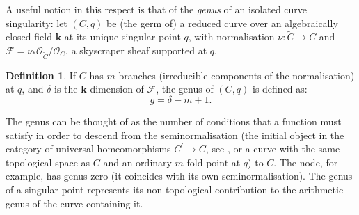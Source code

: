 \documentclass{compositio}
\renewcommand{\k}{\mathbf k}
\newcommand{\OO}{\mathcal O}
\renewcommand{\to}{\rightarrow}
\theoremstyle{plain}
\theoremstyle{definition}
\newtheorem{definition}[thm]{Definition}
\theoremstyle{remark}
\begin{document}
A useful notion in this respect is that of the \emph{genus} of an isolated curve singularity: let $(C,q)$ be (the germ of) a reduced curve over an algebraically closed field $\k$ at its unique singular point $q$, with normalisation $\nu\colon\widetilde{C}\to C$ and $\mathcal F=\nu_*\OO_{\widetilde C}/\OO_C$, a skyscraper sheaf supported at $q$.
\begin{definition}\label{def:genus}\cite{SMY1}
If $C$ has $m$ branches (irreducible components of the normalisation) at $q$, and $\delta$ is the $\k$-dimension of $\mathcal F$, the genus of $(C,q)$ is defined as:
\[g=\delta-m+1.\] 
\end{definition}
The genus can be thought of as the number of conditions that a function must satisfy in order to descend from the seminormalisation (the initial object in the category of universal homeomorphisms $C^\prime\to C$, see \cite[\href{https://stacks.math.columbia.edu/tag/0EUS}{Tag 0EUS}]{stacks-project}, or a curve with the same topological space as $C$ and an ordinary $m$-fold point at $q$) to $C$. The node, for example, has genus zero (it coincides with its own seminormalisation). The genus of a singular point represents its non-topological contribution to the arithmetic genus of the curve containing it.
\end{document}
